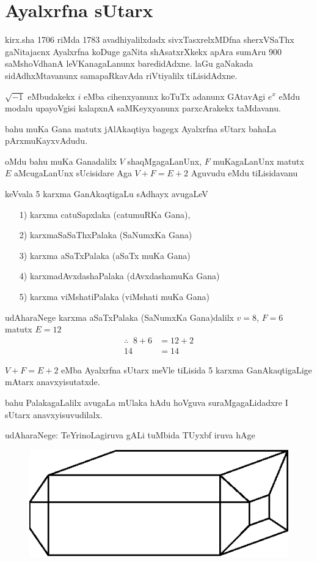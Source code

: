 \chapter{Ayalxrfna sUtarx}

kirx.sha {\rm 1706} riMda {\rm 1783} avadhiyalilxdadx sivxTasxrelxMDfna sherxVSaThx gaNitajacnx Ayalxrfna koDuge gaNita shAsatxrXkekx apAra sumAru {\rm 900} saMshoVdhanA leVKanagaLanunx baredidAdxne. laGu gaNakada sidAdhxMtavanunx samapaRkavAda riVtiyalilx tiLisidAdxne.

$\sqrt{-1}$ eMbudakekx $i$ eMba cihenxyanunx koTuTx adanunx GAtavAgi $e^x$ eMdu modalu upayoVgisi kalapxnA saMKeyxyanunx parxcArakekx taMdavanu.

bahu muKa Gana matutx jAlAkaqtiya bagegx Ayalxrfna sUtarx bahaLa pArxmuKayxvAdudu.

oMdu bahu muKa Ganadalilx $V$ shaqMgagaLanUnx, $F$ muKagaLanUnx matutx $E$ aMcugaLanUnx sUcisidare Aga $V+F=E+2$ Aguvudu eMdu tiLisidavanu 

keVvala {\rm 5} karxma GanAkaqtigaLu sAdhayx avugaLeV
\begin{enumerate}
\item[{\rm 1)}] karxma catuSapxlaka (catumuRKa Gana),
\item[{\rm 2)}] karxmaSaSaThxPalaka (SaNumxKa Gana)
\item[{\rm 3)}] karxma aSaTxPalaka (aSaTx muKa Gana)
\item[{\rm 4)}] karxmadAvxdashaPalaka (dAvxdashamuKa Gana)
\item[{\rm 5)}] karxma viMshatiPalaka (viMshati muKa Gana)
\end{enumerate}

udAharaNege karxma aSaTxPalaka (SaNumxKa Gana)dalilx \quad $v=8$, \quad $F=6$ matutx $E=12$ 
\begin{align*}
\therefore \;\; 8+6 &=12+2\\
14 &=14
\end{align*}

$V+F=E+2$ eMba Ayalxrfna sUtarx meVle tiLisida {\rm 5} karxma GanAkaqtigaLige mAtarx anavxyisutatxde.

bahu PalakagaLalilx avugaLa mUlaka hAdu hoVguva suraMgagaLidadxre I sUtarx anavxyisuvudilalx.

udAharaNege: TeYrinoLagiruva gALi tuMbida TUyxbf iruva hAge
\begin{figure}[H]
\centering
\includegraphics{src/figures/m-147.eps}
\end{figure}

